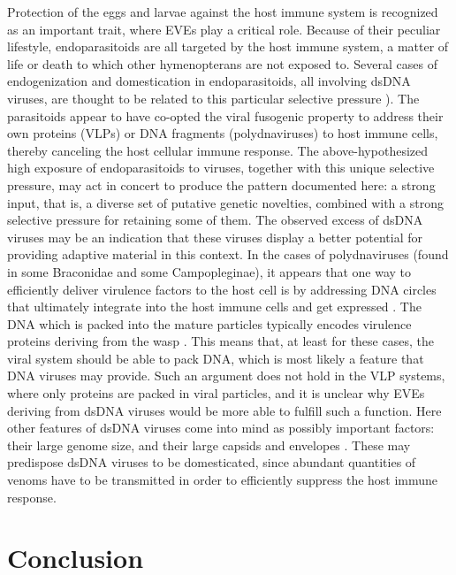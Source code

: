 Protection of the eggs and larvae against the host immune system is recognized as an important trait, where EVEs play a critical role. Because of their peculiar lifestyle, endoparasitoids are all targeted by the host immune system, a matter of life or death to which other hymenopterans are not exposed to. Several cases of endogenization and domestication in endoparasitoids, all involving dsDNA viruses, are thought to be related to this particular selective pressure \citep{bezier_polydnaviruses_2009-1,volkoff_analysis_2010,pichon_recurrent_2015,burke_common_2019,di_giovanni_behavior-manipulating_2020}). The parasitoids appear to have co-opted the viral fusogenic property to address their own proteins (VLPs) or DNA fragments (polydnaviruses) to host immune cells, thereby canceling the host cellular immune response. The above-hypothesized high exposure of endoparasitoids to viruses, together with this unique selective pressure, may act in concert to produce the pattern documented here: a strong input, that is, a diverse set of putative genetic novelties, combined with a strong selective pressure for retaining some of them. The observed excess of dsDNA viruses  may be an indication  that these viruses display a better potential for providing adaptive material in this context. In the cases of polydnaviruses (found in some Braconidae and some Campopleginae), it appears that one way to efficiently deliver virulence factors to the host cell is by addressing DNA circles that ultimately integrate into the host immune cells and get expressed \citep{chevignon_functional_2014, chevignon_cotesia_2018}. The DNA which is packed into the mature particles typically encodes virulence proteins deriving from the wasp \citep{espagne_genome_2004}. This means that, at least for these cases, the viral system should be able to pack DNA, which is most likely a feature that DNA viruses may provide. Such an argument does not hold in the VLP systems, where only proteins are packed in viral particles, and it is unclear why EVEs deriving from dsDNA viruses would be more able to fulfill such a function. Here other features of dsDNA viruses come into mind as possibly important factors: their large genome size, and their large capsids and envelopes \citep{chaudhari_scaling_2021}. These may predispose dsDNA viruses to be domesticated, since abundant quantities of venoms have to be transmitted in order to efficiently suppress the host immune response.


\section{Conclusion}

